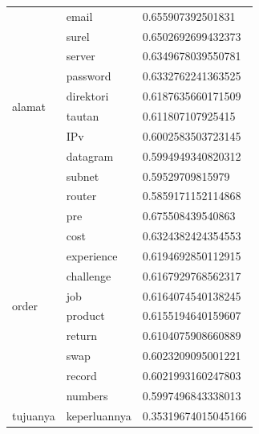 \begin{enumerate}
\begin{longtable}[c]{|l|l|l|}
    \multirow[t]{10}{*}{alamat}   & email           & 0.655907392501831   \\ \cline{2-3}
                                  & surel           & 0.6502692699432373  \\ \cline{2-3}
                                  & server          & 0.6349678039550781  \\ \cline{2-3}
                                  & password        & 0.6332762241363525  \\ \cline{2-3}
                                  & direktori       & 0.6187635660171509  \\ \cline{2-3}
                                  & tautan          & 0.611807107925415   \\ \cline{2-3}
                                  & IPv             & 0.6002583503723145  \\ \cline{2-3}
                                  & datagram        & 0.5994949340820312  \\ \cline{2-3}
                                  & subnet          & 0.59529709815979    \\ \cline{2-3}
                                  & router          & 0.5859171152114868  \\ \hline
    \multirow[t]{10}{*}{order}    & pre             & 0.675508439540863   \\ \cline{2-3}
                                  & cost            & 0.6324382424354553  \\ \cline{2-3}
                                  & experience      & 0.6194692850112915  \\ \cline{2-3}
                                  & challenge       & 0.6167929768562317  \\ \cline{2-3}
                                  & job             & 0.6164074540138245  \\ \cline{2-3}
                                  & product         & 0.6155194640159607  \\ \cline{2-3}
                                  & return          & 0.6104075908660889  \\ \cline{2-3}
                                  & swap            & 0.6023209095001221  \\ \cline{2-3}
                                  & record          & 0.6021993160247803  \\ \cline{2-3}
                                  & numbers         & 0.5997496843338013  \\ \hline
    \multirow[t]{10}{*}{tujuanya} & keperluannya    & 0.35319674015045166 \\ \cline{2-3}

\end{longtable}
\end{enumerate}
